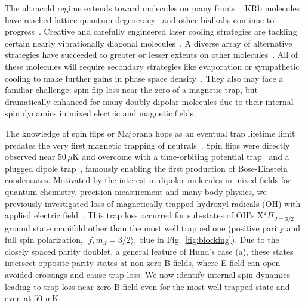 \documentclass[%
 reprint,
 amsmath,amssymb,
 aps,
prl,
]{revtex4-1}
\begin{document}
The ultracold regime extends toward molecules on many fronts~\cite{Carr2009}. 
KRb molecules have reached lattice quantum degeneracy~\cite{Moses2015} and other bialkalis continue to progress~\cite{Takekoshi2014, Park2015,Guo2016,Liu2017}. 
Creative and carefully engineered laser cooling strategies are tackling certain nearly vibrationally diagonal molecules~\cite{Stuhl2008,Shuman2010,Hummon2013, Barry2014, Zhelyazkova2014, Steinecker2016, Hemmerling2016}. 
A diverse array of alternative strategies have succeeded to greater or lesser extents on other molecules~\cite{Doyle1998, Bethlem1999, Bochinski2003, Narevicius2008, Wiederkehr2012, Prehn2016,Liu2017a}. 
All of these molecules will require secondary strategies like evaporation or sympathetic cooling to make further gains in phase space density~\cite{Parazzoli2011, Stuhl2012evap, Quemener2016}. 
They also may face a familiar challenge: spin flip loss near the zero of a magnetic trap, but dramatically enhanced for many doubly dipolar molecules due to their internal spin dynamics in mixed electric and magnetic fields. 

The knowledge of spin flips or Majorana hops as an eventual trap lifetime limit predates the very first magnetic trapping of neutrals~\cite{Migdall1985}. 
Spin flips were directly observed near $50\,\mu\text{K}$ and overcome with a time-orbiting potential trap~\cite{Petrich1995} and a plugged dipole trap~\cite{Davis1995}, famously enabling the first production of Bose-Einstein condensates. 
Motivated by the interest in dipolar molecules in mixed fields for quantum chemistry, precision measurement and many-body physics, we previously investigated loss of magnetically trapped hydroxyl radicals (OH) with applied electric field~\cite{Stuhl2012uwave}. 
This trap loss occurred for sub-states of OH's $\mathrm{X}^2\Pi_{J=3/2}$ ground state manifold other than the most well trapped one (positive parity and full spin polarization, $|f,m_J=3/2\rangle$, blue in Fig.~\ref{fig:blocking}). 
Due to the closely spaced parity doublet, a general feature of Hund's case (a), these states intersect opposite parity states at non-zero B-fields, where E-field can open avoided crossings and cause trap loss. 
We now identify internal spin-dynamics leading to trap loss near zero B-field even for the most well trapped state and even at $50\text{ mK}$.
\end{document}
